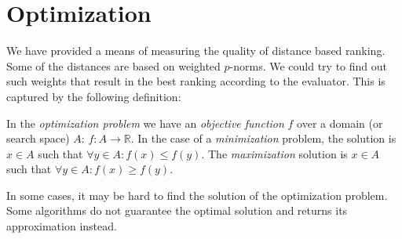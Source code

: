 \section{Optimization}
We have provided a means of measuring the quality of distance based ranking. Some of the distances are based on weighted $p$-norms. We could try to find out such weights that result in the best ranking according to the evaluator. This is captured by the following definition:
\begin{definition}
	In the \emph{optimization problem} we have an \emph{objective function} $f$ over a domain (or search space) $A$: $f: A \rightarrow \mathbb{R}$. In the case of a \emph{minimization} problem, the solution is $x \in A$ such that $\forall y \in A: f(x) \le f(y)$. The \emph{maximization} solution is $x \in A$ such that $\forall y \in A: f(x) \ge f(y)$.
\end{definition}
In some cases, it may be hard to find the solution of the optimization problem. Some algorithms do not guarantee the optimal solution and returns its approximation instead.
